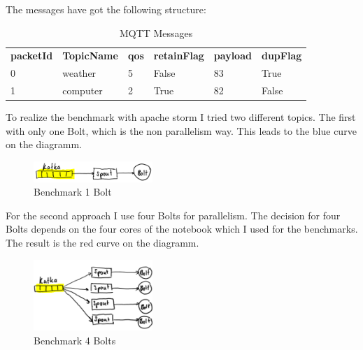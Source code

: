 The messages have got the following structure:

   \begin{table}[h!]
     \centering
     \begin{tabular}{llllll}
       \textbf{packetId}  & \textbf{TopicName} & \textbf{qos} & \textbf{retainFlag} & \textbf{payload} & \textbf{dupFlag} \\
       0 & weather & 5 & False & 83 & True \\
       1 & computer & 2 & True & 82 & False \\
     \end{tabular}
     \caption{MQTT Messages}
     \label{MQTT Messages}
   \end{table}

To realize the benchmark with apache storm I tried two different topics.
The first with only one Bolt, which is the non parallelism way. This leads to the blue curve on the diagramm.
\begin{figure}[H]
\centering
\captionsetup{justification=centering}
\includegraphics[width=0.4\textwidth]{images/benchmark_topic1.png}
\caption[Benchmark 1 Bolt]{Benchmark 1 Bolt}
\end{figure}

For the second approach I use four Bolts for parallelism.
The decision for four Bolts depends on the four cores of the notebook which I used for the benchmarks.
The result is the red curve on the diagramm.

\begin{figure}[H]
\centering
\captionsetup{justification=centering}
\includegraphics[width=0.4\textwidth]{images/benchmark_topic2.png}
\caption[Benchmark 4 Bolts]{Benchmark 4 Bolts}
\end{figure}



